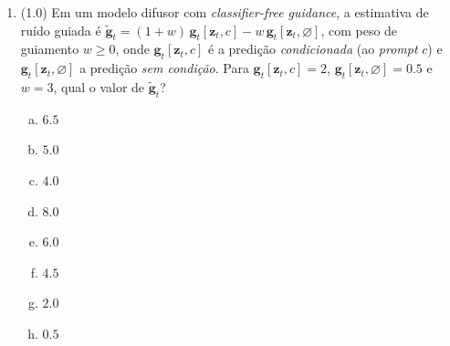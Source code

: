 \documentclass[11pt,a4paper]{article}
\begin{document}
\begin{enumerate}[1)]
\textbf{IV.} Quando os suportes de $P$ e $P^{*}$ são disjuntos, a divergência de Jensen--Shannon satura em seu valor máximo $\ln 2$ e o gradiente para o gerador desaparece.

\textbf{V.} O \textit{mode collapse} ocorre porque o termo de cobertura da Jensen--Shannon gera um gradiente forte que força o gerador a cobrir as modas ignoradas.

\begin{enumerate}[a)]
    \item Apenas I, II e III estão corretas.
    \item Apenas I, III e IV estão corretas.
    \item Apenas I, II, III e IV estão corretas.
    \item Apenas II, III, IV e V estão corretas.
    \item Apenas I, II e IV estão corretas.
    \item Apenas I e II estão corretas.
    \item Todas as afirmações estão corretas.
    \item Apenas III, IV e V estão corretas.
\end{enumerate}

\item (1.0) Em um modelo difusor com \textit{classifier-free guidance}, a estimativa de ruído guiada é $\tilde{\mathbf{g}}_t = (1 + w)\,\mathbf{g}_t[\mathbf{z}_t, c] - w\,\mathbf{g}_t[\mathbf{z}_t, \varnothing]$, com peso de guiamento $w \ge 0$, onde $\mathbf{g}_t[\mathbf{z}_t, c]$ é a predição \emph{condicionada} (ao \textit{prompt} $c$) e $\mathbf{g}_t[\mathbf{z}_t, \varnothing]$ a predição \emph{sem condição}. Para $\mathbf{g}_t[\mathbf{z}_t, c] = 2$, $\mathbf{g}_t[\mathbf{z}_t, \varnothing] = 0.5$ e $w = 3$, qual o valor de $\tilde{\mathbf{g}}_t$?

\begin{enumerate}[a)]
    \item $6.5$
    \item $5.0$
    \item $4.0$
    \item $8.0$
    \item $6.0$
    \item $4.5$
    \item $2.0$
    \item $0.5$
\end{enumerate}

\end{enumerate}
\end{document}
